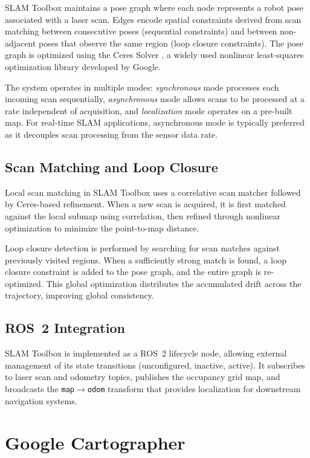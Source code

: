 SLAM Toolbox maintains a pose graph where each node represents a robot pose associated with a laser scan. Edges encode spatial constraints derived from scan matching between consecutive poses (sequential constraints) and between non-adjacent poses that observe the same region (loop closure constraints). The pose graph is optimized using the Ceres Solver \citep{agarwal2010ceres}, a widely used nonlinear least-squares optimization library developed by Google.

The system operates in multiple modes: \emph{synchronous} mode processes each incoming scan sequentially, \emph{asynchronous} mode allows scans to be processed at a rate independent of acquisition, and \emph{localization} mode operates on a pre-built map. For real-time SLAM applications, asynchronous mode is typically preferred as it decouples scan processing from the sensor data rate.

\subsection{Scan Matching and Loop Closure}

Local scan matching in SLAM Toolbox uses a correlative scan matcher followed by Ceres-based refinement. When a new scan is acquired, it is first matched against the local submap using correlation, then refined through nonlinear optimization to minimize the point-to-map distance.

Loop closure detection is performed by searching for scan matches against previously visited regions. When a sufficiently strong match is found, a loop closure constraint is added to the pose graph, and the entire graph is re-optimized. This global optimization distributes the accumulated drift across the trajectory, improving global consistency.

\subsection{ROS~2 Integration}

SLAM Toolbox is implemented as a ROS~2 lifecycle node, allowing external management of its state transitions (unconfigured, inactive, active). It subscribes to laser scan and odometry topics, publishes the occupancy grid map, and broadcasts the \texttt{map}$\rightarrow$\texttt{odom} transform that provides localization for downstream navigation systems.

\section{Google Cartographer}

